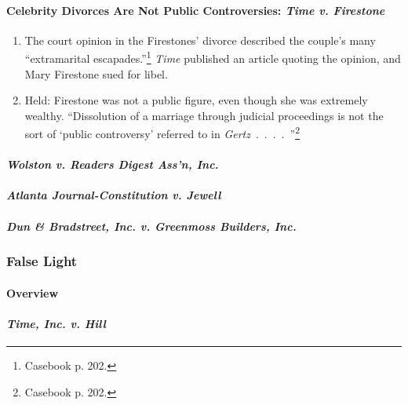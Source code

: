 \paragraph{Celebrity Divorces Are Not Public Controversies: \emph{Time v. 
Firestone}}

\begin{enumerate}
    \item The court opinion in the Firestones' divorce described the couple's 
    many ``extramarital escapades.''\footnote{Casebook p. 202.} \emph{Time} 
    published an article quoting the opinion, and Mary Firestone sued for libel.
    \item Held: Firestone was not a public figure, even though she was extremely 
    wealthy. ``Dissolution of a marriage through judicial proceedings is not the 
    sort of `public controversy' referred to in 
    \emph{Gertz}~.~.~.~.~''\footnote{Casebook p. 202.}
\end{enumerate}

\paragraph{\emph{Wolston v. Readers Digest Ass'n, Inc.}}


\paragraph{\emph{Atlanta Journal-Constitution v. Jewell}}


\paragraph{\emph{Dun \& Bradstreet, Inc. v. Greenmoss Builders, Inc.}}


\subsubsection{False Light}

\paragraph{Overview}


\paragraph{\emph{Time, Inc. v. Hill}}

